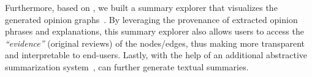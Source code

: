 Furthermore, based on \system{}, we built a summary explorer that visualizes the generated opinion graphs~\cite{wang2020extremereader}. By leveraging the provenance of extracted opinion phrases and explanations, this summary explorer also allows users to access the \textit{``evidence''} (original reviews) of the nodes/edges, thus making \system{} more transparent and interpretable to end-users. Lastly, with the help of an additional abstractive summarization system~\cite{opiniondigest}, \system{} can further generate textual summaries.